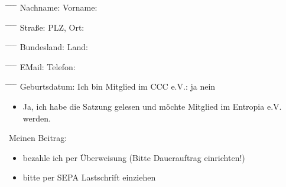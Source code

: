 \documentclass{scrartcl}
\begin{document}
\begin{tabbing}
\hspace*{3cm}\= \hspace*{6cm} \= \hspace*{2cm} \= \hspace*{4cm} \= \kill
Nachname: \> \underline{\hspace{150pt}} \> Vorname: \>  \underline{\hspace{150pt}}
\end{tabbing}
\begin{tabbing}
\hspace*{3cm}\= \hspace*{6cm} \= \hspace*{2cm} \= \hspace*{4cm} \= \kill
Stra{\ss}e: \> \underline{\hspace{150pt}} \> PLZ, Ort: \> \underline{\hspace{150pt}}
\end{tabbing}
\begin{tabbing}
\hspace*{3cm}\= \hspace*{6cm} \= \hspace*{2cm} \= \hspace*{4cm} \= \kill
Bundesland: \> \underline{\hspace{150pt}} \> Land: \> \underline{\hspace{150pt}}
\end{tabbing}
\begin{tabbing}
\hspace*{3cm}\= \hspace*{6cm} \= \hspace*{2cm} \= \hspace*{4cm} \= \kill
EMail: \> \underline{\hspace{150pt}} \> Telefon: \> \underline{\hspace{150pt}}
\end{tabbing}
\begin{tabbing}
\hspace*{3cm}\= \hspace*{6cm} \= \hspace*{2cm} \= \hspace*{4cm} \= \kill
Geburtsdatum: \> \underline{\hspace{150pt}} \> Ich bin Mitglied im CCC e.V.:  \Square ja \Square nein
\end{tabbing}
\begin{itemize}
\item[\Square] Ja, ich habe die Satzung gelesen und m\"ochte Mitglied im Entropia e.V. werden.
\end{itemize}
Meinen Beitrag:
\begin{itemize}
\item[\Square] bezahle ich per \"Uberweisung (Bitte Dauerauftrag einrichten!)
\item[\Square] bitte per SEPA Lastschrift einziehen
\end{itemize}
\addvspace{0.4cm}
\end{document}
